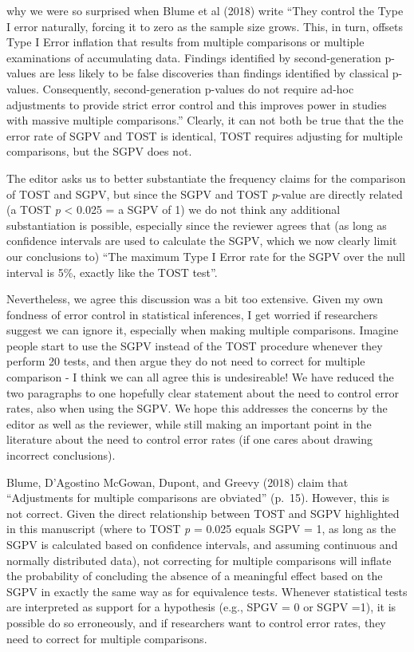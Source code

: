 \documentclass[man]{apa6}
\begin{document}
\begin{enumerate}
  why we were so surprised when Blume et al (2018) write \enquote{They
  control the Type I error naturally, forcing it to zero as the sample
  size grows. This, in turn, offsets Type I Error inflation that results
  from multiple comparisons or multiple examinations of accumulating
  data. Findings identified by second-generation p-values are less
  likely to be false discoveries than findings identified by classical
  p-values. Consequently, second-generation p-values do not require
  ad-hoc adjustments to provide strict error control and this improves
  power in studies with massive multiple comparisons.} Clearly, it can
  not both be true that the the error rate of SGPV and TOST is
  identical, TOST requires adjusting for multiple comparisons, but the
  SGPV does not.
\end{enumerate}

The editor asks us to better substantiate the frequency claims for the
comparison of TOST and SGPV, but since the SGPV and TOST \emph{p}-value
are directly related (a TOST \emph{p} \textless{} 0.025 = a SGPV of 1)
we do not think any additional substantiation is possible, especially
since the reviewer agrees that (as long as confidence intervals are used
to calculate the SGPV, which we now clearly limit our conclusions to)
\enquote{The maximum Type I Error rate for the SGPV over the null
interval is 5\%, exactly like the TOST test}.

Nevertheless, we agree this discussion was a bit too extensive. Given my
own fondness of error control in statistical inferences, I get worried
if researchers suggest we can ignore it, especially when making multiple
comparisons. Imagine people start to use the SGPV instead of the TOST
procedure whenever they perform 20 tests, and then argue they do not
need to correct for multiple comparison - I think we can all agree this
is undesireable! We have reduced the two paragraphs to one hopefully
clear statement about the need to control error rates, also when using
the SGPV. We hope this addresses the concerns by the editor as well as
the reviewer, while still making an important point in the literature
about the need to control error rates (if one cares about drawing
incorrect conclusions).

Blume, D'Agostino McGowan, Dupont, and Greevy (2018) claim that
\enquote{Adjustments for multiple comparisons are obviated} (p.~15).
However, this is not correct. Given the direct relationship between TOST
and SGPV highlighted in this manuscript (where to TOST \emph{p} = 0.025
equals SGPV = 1, as long as the SGPV is calculated based on confidence
intervals, and assuming continuous and normally distributed data), not
correcting for multiple comparisons will inflate the probability of
concluding the absence of a meaningful effect based on the SGPV in
exactly the same way as for equivalence tests. Whenever statistical
tests are interpreted as support for a hypothesis (e.g., SPGV = 0 or
SGPV =1), it is possible do so erroneously, and if researchers want to
control error rates, they need to correct for multiple comparisons.
\end{document}
